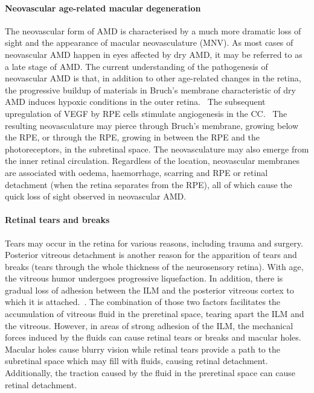 \documentclass{article}
\begin{document}
\paragraph*{Neovascular age-related macular degeneration}
The neovascular form of AMD is characterised by a much more dramatic loss of sight and the appearance of macular neovasculature (MNV).
As most cases of neovascular AMD happen in eyes affected by dry AMD, it may be referred to as a late stage of AMD.
The current understanding of the pathogenesis of neovascular AMD is that, in addition to other age-related changes in the retina, the progressive buildup of materials in Bruch's membrane characteristic of dry AMD induces hypoxic conditions in the outer retina.~\cite{Jager_2008,Newsom_2008}
The subsequent upregulation of VEGF by RPE cells stimulate angiogenesis in the CC.~\cite{Jager_2008}
The resulting neovasculature may pierce through Bruch's membrane, growing below the RPE, or through the RPE, growing in between the RPE and the photoreceptors, in the subretinal space.
The neovasculature may also emerge from the inner retinal circulation.
Regardless of the location, neovascular membranes are associated with oedema, haemorrhage, scarring and RPE or retinal detachment (when the retina separates from the RPE), all of which cause the quick loss of sight observed in neovascular AMD.~\cite{Gupta_2015,Jager_2008}\\

\paragraph*{Retinal tears and breaks}
Tears may occur in the retina for various reasons, including trauma and surgery.
Posterior vitreous detachment is another reason for the apparition of tears and breaks (tears through the whole thickness of the neurosensory retina).
With age, the vitreous humor undergoes progressive liquefaction.
In addition, there is gradual loss of adhesion between the ILM and the posterior vitreous cortex to which it is attached.~\cite{Bottos_2012,Medina_2016}.
The combination of those two factors facilitates the accumulation of vitreous fluid in the preretinal space, tearing apart the ILM and the vitreous.
However, in areas of strong adhesion of the ILM, the mechanical forces induced by the fluids can cause retinal tears or breaks and macular holes.~\cite{Shechtman_2009}
Macular holes cause blurry vision while retinal tears provide a path to the subretinal space which may fill with fluids, causing retinal detachment.~\cite{Medina_2016}
Additionally, the traction caused by the fluid in the preretinal space can cause retinal detachment.\\
\end{document}
